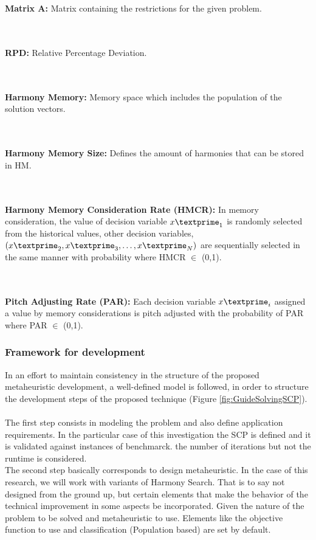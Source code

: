 ~\\~\\
\textbf{Matrix A:} 
Matrix containing the restrictions for the given problem.

~\\~\\
\textbf{RPD:} 
Relative Percentage Deviation.

~\\~\\
\textbf{Harmony Memory:} 
Memory space which includes the population of the solution vectors.

~\\~\\
\textbf{Harmony Memory Size:} 
Defines the amount of harmonies that can be stored in HM.

~\\~\\
\textbf{Harmony Memory Consideration Rate (HMCR):} 
In memory consideration, the value of decision variable ${x\textprime}_1$ is randomly selected from the historical values, other decision variables, $({x\textprime}_2, {x\textprime}_3,\dots,{x\textprime}_N)$ are sequentially selected in the same manner with probability where HMCR $\in$ (0,1).

~\\~\\
\textbf{Pitch Adjusting Rate (PAR):} 
Each decision variable ${x\textprime}_i$ assigned a value by memory considerations is pitch adjusted with the probability of PAR where PAR $\in$ (0,1).

\subsubsection{Framework for development}
In an effort to maintain consistency in the structure of the proposed metaheuristic development, a well-defined model is followed, in order to structure the development steps of the proposed technique (Figure \ref{fig:GuideSolvingSCP}). \\
~\\
The first step consists in modeling the problem and also define application requirements. In the particular case of this investigation the SCP is defined and it is validated against instances of benchmarck. the number of iterations but not the runtime is considered.\\

The second step basically corresponds to design metaheuristic. In the case of this research, we will work with variants of Harmony Search. That is to say not designed from the ground up, but certain elements that make the behavior of the technical improvement in some aspects be incorporated. Given the nature of the problem to be solved and metaheuristic to use. Elements like the objective function to use and classification (Population based) are set by default.\\

